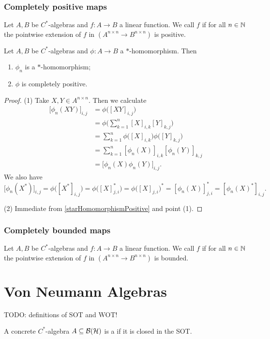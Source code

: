 \subsection{Completely positive maps}
\begin{definition}
Let $A,B$ be $C^*$-algebras and $f:A\to B$ a linear function. We call $f$  if for all $n\in\mathbb{N}$ the pointwise extension of $f$ in $(A^{n\times n}\to B^{n\times n})$ is positive.
\end{definition}

\begin{lemma}
Let $A,B$ be $C^*$-algebras and $\phi:A\to B$ a $*$-homomorphism. Then
\begin{enumerate}
\item $\phi_n$ is a $*$-homomorphism;
\item $\phi$ is completely positive.
\end{enumerate}
\end{lemma}
\begin{proof}
(1) Take $X,Y\in A^{n\times n}$. Then we calculate
\begin{align*}
\big[\phi_n(XY)\big]_{i,j} &= \phi\big([XY]_{i,j}\big) \\
&= \phi\Big(\sum_{k=1}^n[X]_{i,k}[Y]_{k,j}\Big) \\
&= \sum_{k=1}^n\phi\big([X]_{i,k}\big)\phi\big([Y]_{k,j}\big) \\
&= \sum_{k=1}^n[\phi_n(X)]_{i,k}[\phi_n(Y)]_{k,j} \\
&= \big[\phi_n(X)\phi_n(Y)\big]_{i,j}.
\end{align*}
We also have
\[ \big[\phi_n(X^*)\big]_{i,j} = \phi\big([X^*]_{i,j}\big) = \phi\big([X]_{j,i}^*\big) = \phi\big([X]_{j,i}\big)^* = [\phi_n(X)]_{j,i}^* = [\phi_n(X)^*]_{i,j}. \]

(2) Immediate from \ref{starHomomorphismPositive} and point (1).
\end{proof}

\subsection{Completely bounded maps}
\begin{definition}
Let $A,B$ be $C^*$-algebras and $f:A\to B$ a linear function. We call $f$  if for all $n\in\mathbb{N}$ the pointwise extension of $f$ in $(A^{n\times n}\to B^{n\times n})$ is bounded.
\end{definition}

\chapter{Von Neumann Algebras}
TODO: definitions of SOT and WOT!
\begin{definition}
A concrete $C^*$-algebra $A\subseteq \operatorname{\mathcal{B}}(\mathcal{H})$ is a  if it is closed in the SOT.
\end{definition}

